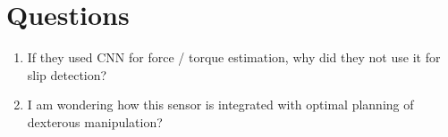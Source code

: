 \documentclass[10pt, twocolumn]{article}
\begin{document}
\section{Questions}
\begin{enumerate}
  \item If they used CNN for force / torque estimation, why did they not use it
    for slip detection?

  \item I am wondering how this sensor is integrated with optimal planning
    of dexterous manipulation?
\end{enumerate}
\end{document}
